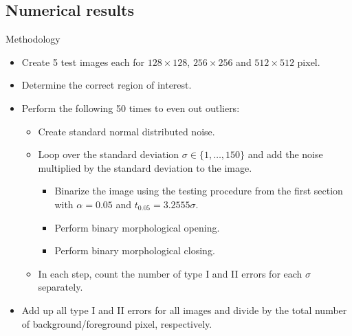 \documentclass[presentation]{beamer}
\begin{document}
\subsection{Numerical results}

\begin{frame}{Methodology}
	\begin{itemize}
		\item Create 5 test images each for $128 \times 128$, $256 \times 256$ and $512 \times 512$ pixel.
		\item Determine the correct region of interest.
		\item Perform the following 50 times to even out outliers:
		\begin{itemize}
			\item Create standard normal distributed noise.
			\item Loop over the standard deviation $\sigma \in \{ 1, \dots, 150 \}$ and add the noise multiplied by the standard deviation to the image.
			\begin{itemize}
				\item Binarize the image using the testing procedure from the first section with $\alpha = 0.05$ and $t_{0.05} = 3.2555 \sigma$.
				\item Perform binary morphological opening.
				\item Perform binary morphological closing.
			\end{itemize}
			\item In each step, count the number of type I and II errors for each $\sigma$ separately.
		\end{itemize}
		\item Add up all type I and II errors for all images and divide by the total number of background/foreground pixel, respectively.
	\end{itemize}
\end{frame}
\end{document}
